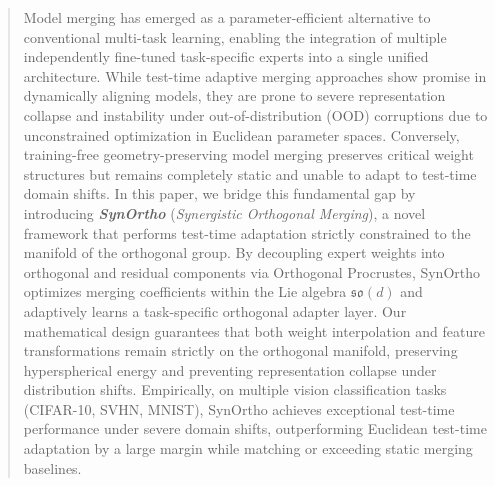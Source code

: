 \documentclass{article}
\theoremstyle{plain}
\theoremstyle{definition}
\theoremstyle{remark}
\begin{document}

\printAffiliationsAndNotice{\icmlEqualContribution}

\begin{abstract}
Model merging has emerged as a parameter-efficient alternative to conventional multi-task learning, enabling the integration of multiple independently fine-tuned task-specific experts into a single unified architecture. While test-time adaptive merging approaches show promise in dynamically aligning models, they are prone to severe representation collapse and instability under out-of-distribution (OOD) corruptions due to unconstrained optimization in Euclidean parameter spaces. Conversely, training-free geometry-preserving model merging preserves critical weight structures but remains completely static and unable to adapt to test-time domain shifts. In this paper, we bridge this fundamental gap by introducing \textbf{\textit{SynOrtho}} (\textit{Synergistic Orthogonal Merging}), a novel framework that performs test-time adaptation strictly constrained to the manifold of the orthogonal group. By decoupling expert weights into orthogonal and residual components via Orthogonal Procrustes, SynOrtho optimizes merging coefficients within the Lie algebra $\mathfrak{so}(d)$ and adaptively learns a task-specific orthogonal adapter layer. Our mathematical design guarantees that both weight interpolation and feature transformations remain strictly on the orthogonal manifold, preserving hyperspherical energy and preventing representation collapse under distribution shifts. Empirically, on multiple vision classification tasks (CIFAR-10, SVHN, MNIST), SynOrtho achieves exceptional test-time performance under severe domain shifts, outperforming Euclidean test-time adaptation by a large margin while matching or exceeding static merging baselines.
\end{abstract}
\end{document}
